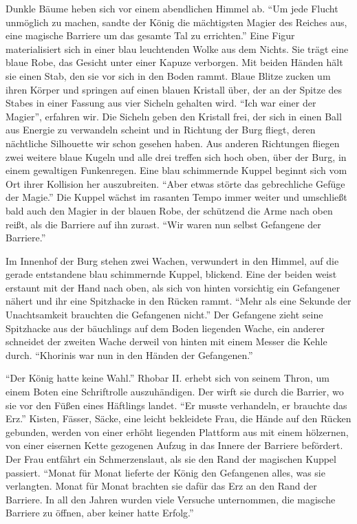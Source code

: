 \documentclass[a5paper,pagesize,numbers=noenddot]{scrbook}
\begin{document}
Dunkle Bäume heben sich vor einem abendlichen Himmel ab.
\enquote{Um jede Flucht unmöglich zu machen, sandte der König die mächtigsten Magier des Reiches aus, eine magische Barriere um das gesamte Tal zu errichten.}
Eine Figur materialisiert sich in einer blau leuchtenden Wolke aus dem Nichts.
Sie trägt eine blaue Robe, das Gesicht unter einer Kapuze verborgen.
Mit beiden Händen hält sie einen Stab, den sie vor sich in den Boden rammt.
Blaue Blitze zucken um ihren Körper und springen auf einen blauen Kristall über, der an der Spitze des Stabes in einer Fassung aus vier Sicheln gehalten wird.
\enquote{Ich war einer der Magier}, erfahren wir.
Die Sicheln geben den Kristall frei, der sich in einen Ball aus Energie zu verwandeln scheint und in Richtung der Burg fliegt, deren nächtliche Silhouette wir schon gesehen haben.
Aus anderen Richtungen fliegen zwei weitere blaue Kugeln und alle drei treffen sich hoch oben, über der Burg, in einem gewaltigen Funkenregen.
Eine blau schimmernde Kuppel beginnt sich vom Ort ihrer Kollision her auszubreiten.
\enquote{Aber etwas störte das gebrechliche Gefüge der Magie.}
Die Kuppel wächst im rasanten Tempo immer weiter und umschließt bald auch den Magier in der blauen Robe, der schützend die Arme nach oben reißt, als die Barriere auf ihn zurast.
\enquote{Wir waren nun selbst Gefangene der Barriere.}

Im Innenhof der Burg stehen zwei Wachen, verwundert in den Himmel, auf die gerade entstandene blau schimmernde Kuppel, blickend.
Eine der beiden weist erstaunt mit der Hand nach oben, als sich von hinten vorsichtig ein Gefangener nähert und ihr eine Spitzhacke in den Rücken rammt.
\enquote{Mehr als eine Sekunde der Unachtsamkeit brauchten die Gefangenen nicht.}
Der Gefangene zieht seine Spitzhacke aus der bäuchlings auf dem Boden liegenden Wache, ein anderer schneidet der zweiten Wache derweil von hinten mit einem Messer die Kehle durch.
\enquote{Khorinis war nun in den Händen der Gefangenen.}

\enquote{Der König hatte keine Wahl.}
Rhobar II. erhebt sich von seinem Thron, um einem Boten eine Schriftrolle auszuhändigen.
Der wirft sie durch die Barrier, wo sie vor den Füßen eines Häftlings landet.
\enquote{Er musste verhandeln, er brauchte das Erz.}
Kisten, Fässer, Säcke, eine leicht bekleidete Frau, die Hände auf den Rücken gebunden, werden von einer erhöht liegenden Plattform aus mit einem hölzernen, von einer eisernen Kette gezogenen Aufzug in das Innere der Barriere befördert.
Der Frau entfährt ein Schmerzenslaut, als sie den Rand der magischen Kuppel passiert.
\enquote{Monat für Monat lieferte der König den Gefangenen alles, was sie verlangten.
Monat für Monat brachten sie dafür das Erz an den Rand der Barriere.
In all den Jahren wurden viele Versuche unternommen, die magische Barriere zu öffnen, aber keiner hatte Erfolg.}
\end{document}
